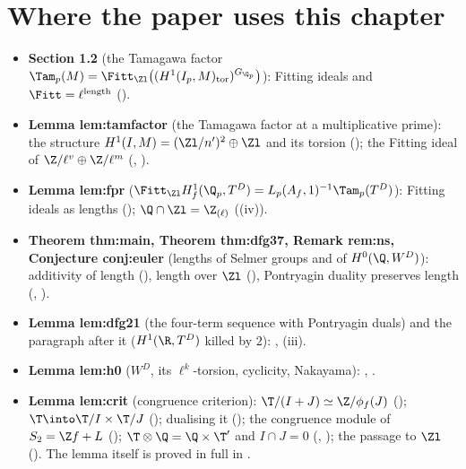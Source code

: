 \section*{Where the paper uses this chapter}

\begin{itemize}
\item \textbf{Section 1.2} (the Tamagawa factor $\Tam_p(M)=\Fitt_{\Zl}\bigl((H^1(I_p,M)_{\mathrm{tor}})^{G_{\Q_p}}\bigr)$): Fitting ideals and $\Fitt=\ell^{\mathrm{length}}$
().
\item \textbf{Lemma lem:tamfactor} (the Tamagawa factor at a multiplicative prime): the structure $H^1(I,M)=(\Zl/n')^2\oplus\Zl$ and its torsion
(); the Fitting ideal of $\Z/\ell^v\oplus\Z/\ell^m$ (, ).
\item \textbf{Lemma lem:fpr} ($\Fitt_{\Zl}H^1_f(\Q_p,T^D)=L_p(A_f,1)^{-1}\Tam_p(T^D)$): Fitting ideals as lengths (); $\Q\cap\Zl=\Z_{(\ell)}$
((iv)).
\item \textbf{Theorem thm:main, Theorem thm:dfg37, Remark rem:ns, Conjecture conj:euler} (lengths of Selmer groups and of $H^0(\Q,W^D)$): additivity of length (), length over $\Zl$
(), Pontryagin duality preserves length (, ).
\item \textbf{Lemma lem:dfg21} (the four-term sequence with Pontryagin duals) and the paragraph after it ($H^1(\R,T^D)$ killed by $2$): ,
(iii).
\item \textbf{Lemma lem:h0} ($W^D$, its $\ell^k$-torsion, cyclicity, Nakayama): , .
\item \textbf{Lemma lem:crit} (congruence criterion): $\T/(I+J)\simeq\Z/\phi_f(J)$ (); $\T\into\T/I\times\T/J$ (); dualising
it (); the congruence module of $S_2=\Z f+L$ (); $\T\otimes\Q=\Q\times\T'$ and
$I\cap J=0$ (, ); the passage to $\Zl$ (). The lemma
itself is proved in full in .

\end{itemize}
